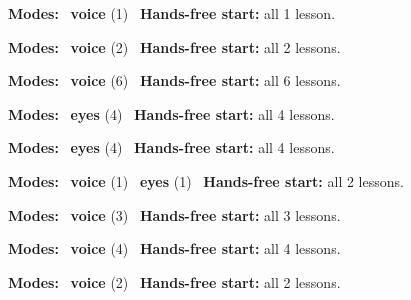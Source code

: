 \expandafter\def\csname hlchaptermodality30\endcsname{%
  {\small\noindent
    \textbf{Modes:} \hlvoicesign{}~\textbf{voice} (1)\quad
    \hlvoicesign{}~\textbf{Hands-free start:} all 1 lesson.%
    \par}\medskip
}

\expandafter\def\csname hlchaptermodality31\endcsname{%
  {\small\noindent
    \textbf{Modes:} \hlvoicesign{}~\textbf{voice} (2)\quad
    \hlvoicesign{}~\textbf{Hands-free start:} all 2 lessons.%
    \par}\medskip
}

\expandafter\def\csname hlchaptermodality32\endcsname{%
  {\small\noindent
    \textbf{Modes:} \hlvoicesign{}~\textbf{voice} (6)\quad
    \hlvoicesign{}~\textbf{Hands-free start:} all 6 lessons.%
    \par}\medskip
}

\expandafter\def\csname hlchaptermodality33\endcsname{%
  {\small\noindent
    \textbf{Modes:} \hlsightsign{}~\textbf{eyes} (4)\quad
    \hlvoicesign{}~\textbf{Hands-free start:} all 4 lessons.%
    \par}\medskip
}

\expandafter\def\csname hlchaptermodality34\endcsname{%
  {\small\noindent
    \textbf{Modes:} \hlsightsign{}~\textbf{eyes} (4)\quad
    \hlvoicesign{}~\textbf{Hands-free start:} all 4 lessons.%
    \par}\medskip
}

\expandafter\def\csname hlchaptermodality35\endcsname{%
  {\small\noindent
    \textbf{Modes:} \hlvoicesign{}~\textbf{voice} (1) \quad \hlsightsign{}~\textbf{eyes} (1)\quad
    \hlvoicesign{}~\textbf{Hands-free start:} all 2 lessons.%
    \par}\medskip
}

\expandafter\def\csname hlchaptermodality36\endcsname{%
  {\small\noindent
    \textbf{Modes:} \hlvoicesign{}~\textbf{voice} (3)\quad
    \hlvoicesign{}~\textbf{Hands-free start:} all 3 lessons.%
    \par}\medskip
}

\expandafter\def\csname hlchaptermodality37\endcsname{%
  {\small\noindent
    \textbf{Modes:} \hlvoicesign{}~\textbf{voice} (4)\quad
    \hlvoicesign{}~\textbf{Hands-free start:} all 4 lessons.%
    \par}\medskip
}

\expandafter\def\csname hlchaptermodality38\endcsname{%
  {\small\noindent
    \textbf{Modes:} \hlvoicesign{}~\textbf{voice} (2)\quad
    \hlvoicesign{}~\textbf{Hands-free start:} all 2 lessons.%
    \par}\medskip
}

